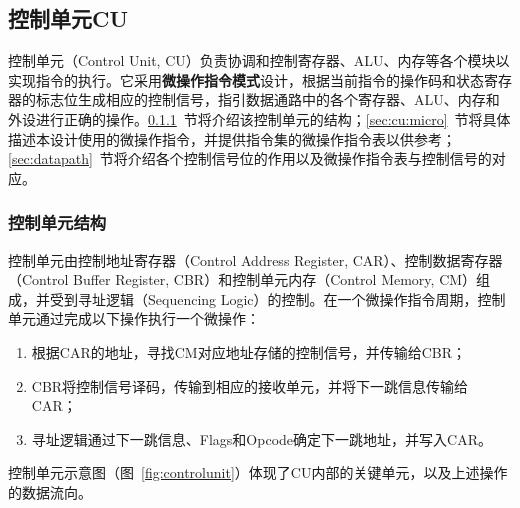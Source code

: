 \documentclass[lang=cn,a4paper,newtx]{elegantpaper}
\begin{document}
  
  


\subsection{控制单元CU}
控制单元（Control Unit, CU）负责协调和控制寄存器、ALU、内存等各个模块以实现指令的执行。它采用\textbf{微操作指令模式}设计，根据当前指令的操作码和状态寄存器的标志位生成相应的控制信号，指引数据通路中的各个寄存器、ALU、内存和外设进行正确的操作。\ref{sec:cu:structure}~节将介绍该控制单元的结构；\ref{sec:cu:micro}~节将具体描述本设计使用的微操作指令，并提供指令集的微操作指令表以供参考；\ref{sec:datapath}~节将介绍各个控制信号位的作用以及微操作指令表与控制信号的对应。

\subsubsection{控制单元结构}\label{sec:cu:structure}
控制单元由控制地址寄存器（Control Address Register, CAR）、控制数据寄存器（Control Buffer Register, CBR）和控制单元内存（Control Memory, CM）组成，并受到寻址逻辑（Sequencing Logic）的控制。在一个微操作指令周期，控制单元通过完成以下操作执行一个微操作：
\begin{enumerate}
  \item 根据CAR的地址，寻找CM对应地址存储的控制信号，并传输给CBR；
  \item CBR将控制信号译码，传输到相应的接收单元，并将下一跳信息传输给CAR；
  \item 寻址逻辑通过下一跳信息、Flags和Opcode确定下一跳地址，并写入CAR。
\end{enumerate}
控制单元示意图（图~\ref{fig:controlunit}）体现了CU内部的关键单元，以及上述操作的数据流向。
\end{document}
